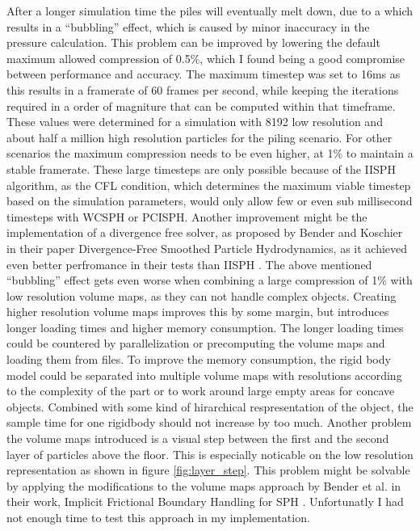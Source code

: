 \documentclass[intern]{cgMA}
\begin{document}
    After a longer simulation time the piles will eventually melt down, due to a which results in a \enquote{bubbling} effect, which is caused by minor inaccuracy in the pressure calculation. This problem can be improved by lowering the default maximum allowed compression of 0.5\%, which I found being a good compromise between performance and accuracy. The maximum timestep was set to 16ms as this results in a framerate of 60 frames per second, while keeping the iterations required in a order of magniture that can be computed within that timeframe. These values were determined for a simulation with 8192 low resolution and about half a million high resolution particles for the piling scenario. For other scenarios the maximum compression needs to be even higher, at 1\% to maintain a stable framerate.
    These large timesteps are only possible because of the IISPH algorithm, as the CFL condition, which determines the maximum viable timestep based on the simulation parameters, would only allow few or even sub millisecond timesteps with WCSPH or PCISPH. Another improvement might be the implementation of a divergence free solver, as proposed by Bender and Koschier in their paper Divergence-Free Smoothed Particle Hydrodynamics, as it achieved even better perfromance in their tests than IISPH \cite{10.1145/2786784.2786796}.
    The above mentioned \enquote{bubbling} effect gets even worse when combining a large compression of 1\% with low resolution volume maps, as they can not handle complex objects. Creating higher resolution volume maps improves this by some margin, but introduces longer loading times and higher memory consumption. The longer loading times could be countered by parallelization or precomputing the volume maps and loading them from files.
    To improve the memory consumption, the rigid body model could be separated into multiple volume maps with resolutions according to the complexity of the part or to work around large empty areas for concave objects. Combined with some kind of hirarchical respresentation of the object, the sample time for one rigidbody should not increase by too much.
    Another problem the volume maps introduced is a visual step between the first and the second layer of particles above the floor. This is especially noticable on the low resolution representation as shown in figure \ref{fig:layer_step}. This problem might be solvable by applying the modifications to the volume maps approach by Bender et al. in their work, Implicit Frictional Boundary Handling for SPH \cite{9123549}. Unfortunatly I had not enough time to test this approach in my implementation.
\end{document}
